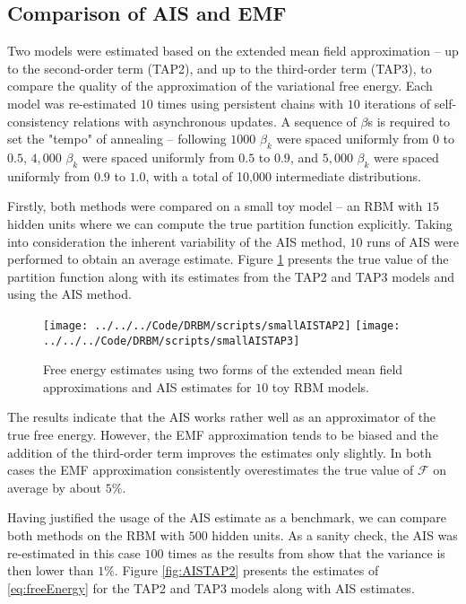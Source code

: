 \subsection{Comparison of AIS and EMF}
Two models were estimated based on the extended mean field approximation -- up to the second-order term (TAP2), and up to the third-order term (TAP3), to compare the quality of the approximation of the variational free energy.
Each model was re-estimated $10$ times using persistent chains with $10$ iterations of self-consistency relations with asynchronous updates. 
A sequence of $\beta$s is required to set the "tempo" of annealing -- following \cite{salakhutdinov2008learning} $1000$ $\beta_k$ were spaced uniformly from  $0 $ to  $0.5$, $4,000$ $\beta_k$ were spaced uniformly from $0.5$ to $0.9$, and $5,000$ $\beta_k$ were spaced uniformly from $0.9$ to $1.0$, with a total of 10,000 intermediate distributions. 

Firstly, both methods were compared on a small toy model -- an RBM with $15$ hidden units where we can compute the true partition function explicitly. 
Taking into consideration the inherent variability of the AIS method, $10$ runs of AIS were performed to obtain an average estimate. Figure \ref{fig:AISTAP2small} presents the true value of the partition function along with its estimates from the TAP2 and TAP3 models and using the AIS method.

\begin{figure}[!htb]
%
 \texttt{[image: ../../../Code/DRBM/scripts/smallAISTAP2]}
\endminipage 
{}  
\texttt{[image: ../../../Code/DRBM/scripts/smallAISTAP3]}
\endminipage\hfill
  \caption[Comparison of AIS and EMF on toy RBM]{Free energy estimates using two forms of the extended mean field approximations and AIS estimates for $10$ toy RBM models.}
  \label{fig:AISTAP2small}
\end{figure}
The results indicate that the AIS works rather well as an approximator of the true free energy. However, the EMF approximation tends to be biased and the addition of the third-order term improves the estimates only slightly. In both cases the EMF approximation consistently overestimates the true value of $\mathcal{F}$ on average by about $5\%$. 

Having justified the usage of the AIS estimate as a benchmark, we can compare both methods on the RBM with $500$ hidden units. As a sanity check, the AIS was re-estimated in this case $100$ times as the results from \cite{salakhutdinov2008learning} show that the variance is then lower than $1\%$. Figure \ref{fig:AISTAP2} presents the estimates of \ref{eq:freeEnergy} for the TAP2 and TAP3 models along with AIS estimates.

